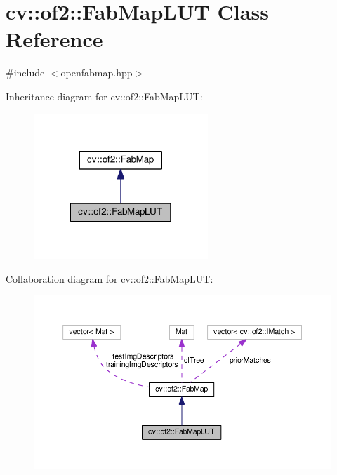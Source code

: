 \hypertarget{classcv_1_1of2_1_1FabMapLUT}{\section{cv\-:\-:of2\-:\-:Fab\-Map\-L\-U\-T Class Reference}
\label{classcv_1_1of2_1_1FabMapLUT}
}


{\ttfamily \#include $<$openfabmap.\-hpp$>$}



Inheritance diagram for cv\-:\-:of2\-:\-:Fab\-Map\-L\-U\-T\-:\nopagebreak
\begin{figure}[H]
\begin{center}
\leavevmode
\includegraphics[width=186pt]{classcv_1_1of2_1_1FabMapLUT__inherit__graph}
\end{center}
\end{figure}


Collaboration diagram for cv\-:\-:of2\-:\-:Fab\-Map\-L\-U\-T\-:\nopagebreak
\begin{figure}[H]
\begin{center}
\leavevmode
\includegraphics[width=350pt]{classcv_1_1of2_1_1FabMapLUT__coll__graph}
\end{center}
\end{figure}
